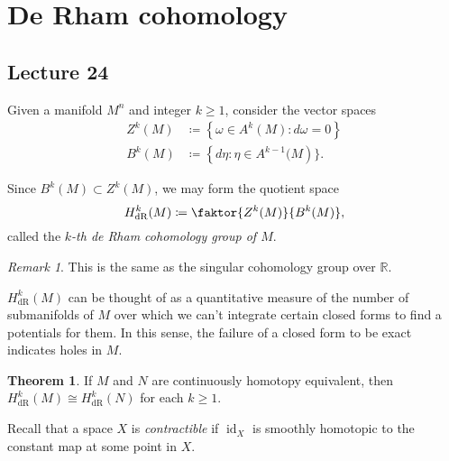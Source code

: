 \documentclass[10pt,letterpaper,cm]{nupset}
\theoremstyle{definition}
\theoremstyle{theorem}
\newtheorem{theorem}[definition]{Theorem}
\theoremstyle{remark}
\newtheorem{remark}[definition]{Remark}
\newcommand{\R}{\mathbb R}
\newcommand{\1}{\mathbf{1}}
\newcommand{\0}{\vec 0}
\DeclareMathOperator{\id}{id}
\DeclareMathOperator{\dr}{dR}
\begin{document}
\section{De Rham cohomology}

\subsection{Lecture 24}


Given a manifold $M^n$ and integer $k\geq 1$, consider the vector spaces
\begin{align*}
  Z^k(M) &  \coloneqq \left\{\omega \in A^k(M) : d\omega =0\right\}
 \\  B^k(M) & \coloneqq \left\{ d\eta : \eta \in A^{k-1}(M\right)\}.
 \end{align*}

 Since $B^k(M) \subset Z^k(M)$, we may form the quotient space $$ H_{\dr}^k(M) \coloneqq  \faktor{Z^k(M)}{B^k(M)},$$ called the \textit{$k$-th de Rham cohomology group of $M$}.

\smallskip

\begin{remark}
This is the same as the singular cohomology group over $\R$.
\end{remark}

\smallskip

$H_{\dr}^k(M)$ can be thought of as a quantitative measure of the number of submanifolds of $M$ over which we can't integrate certain closed forms to find a potentials for them. In this sense, the failure of a closed form to be exact indicates holes in $M$.

\smallskip

\begin{theorem}
If $M$ and $N$ are continuously homotopy equivalent, then $H_{\dr}^k(M) \cong H_{\dr}^k(N)$ for each $k\geq 1$.
\end{theorem}

\medskip

Recall that a space $X$ is \textit{contractible} if $\id_X$ is smoothly homotopic to the constant map at some point in $X$. 
\end{document}
